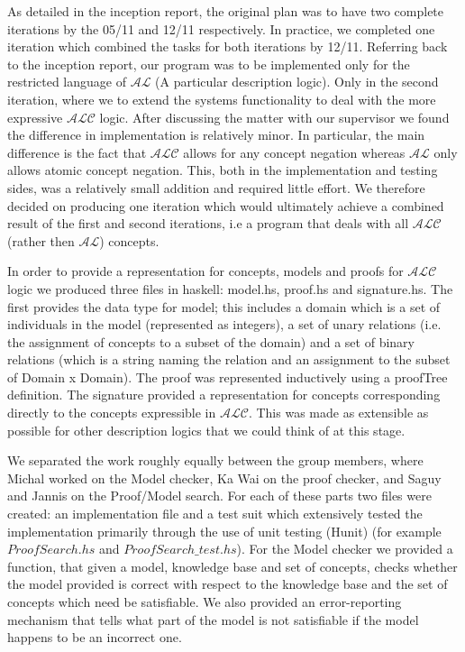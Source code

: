 As detailed in the inception report, the original plan was to have two complete iterations by the 05/11 and 12/11 respectively. In practice, we completed one iteration which combined the tasks for both iterations by 12/11. Referring back to the inception report, our program was to be implemented only for the restricted language of $\mathcal{AL}$ (A particular description logic). Only in the second iteration, where we to extend the systems functionality to deal with the more expressive $\mathcal{ALC}$ logic. After discussing the matter with our supervisor we found the difference in implementation is relatively minor. In particular, the main difference is the fact that $\mathcal{ALC}$ allows for any concept negation whereas $\mathcal{AL}$ only allows atomic concept negation. This, both in the implementation and testing sides, was a relatively small addition and required little effort. We therefore decided on producing one iteration which would ultimately achieve a combined result of the first and second iterations, i.e a program that deals with all $\mathcal{ALC}$ (rather then $\mathcal{AL}$) concepts.

In order to provide a representation for concepts, models and proofs for $\mathcal{ALC}$ logic we produced three files in haskell: model.hs, proof.hs and signature.hs. The first provides the data type for model; this includes a domain which is a set of individuals in the model (represented as integers), a set of unary relations (i.e. the assignment of concepts to a subset of the domain) and a set of binary relations (which is a string naming the relation and an assignment to the subset of Domain x Domain). The proof was represented inductively using a proofTree definition. The signature provided a representation for concepts corresponding directly to the concepts expressible in $\mathcal{ALC}$. This was made as extensible as possible for other description logics that we could think of at this stage. 

We separated the work roughly equally between the group members, where Michal worked on the Model checker, Ka Wai on the proof checker, and Saguy and Jannis on the Proof/Model search. For each of these parts two files were created: an implementation file and a test suit which extensively tested the implementation primarily through the use of unit testing (Hunit) (for example $ProofSearch.hs$ and $ProofSearch\_test.hs$). For the Model checker we provided a function, that given a model, knowledge base and set of concepts, checks whether the model provided is correct with respect to the knowledge base and the set of concepts which need be satisfiable. We also provided an error-reporting mechanism that tells what part of the model is not satisfiable if the model happens to be an incorrect one. 

